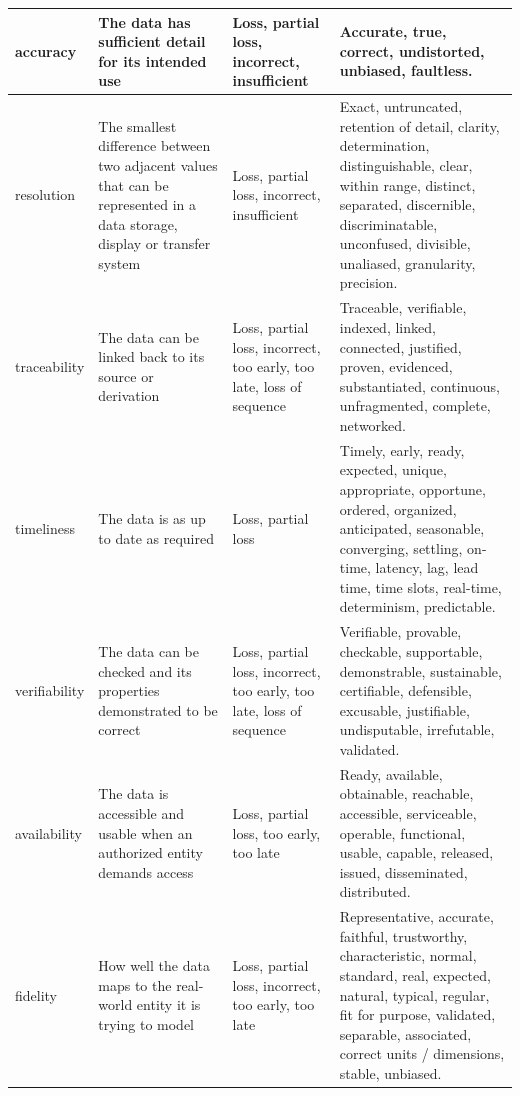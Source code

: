 \begin{longtable}{|L{}|L{}|L{}|L{}|}
  \hline
{}\Gls{accuracy} &
  The data has sufficient detail for its intended use &
  Loss, partial loss, incorrect, insufficient &
  Accurate, true, correct, undistorted, unbiased, faultless.\\
  \hline
{}\Gls{resolution} &
  The smallest difference between two adjacent values that can be represented in a data storage, display or transfer system &
  Loss, partial loss, incorrect, insufficient &
  Exact, untruncated, retention of detail, clarity, determination, distinguishable, clear, within range, distinct, separated, discernible, discriminatable, unconfused, divisible, unaliased, granularity, precision.\\
  \hline
  \Gls{traceability} & The data can be linked back to its source or derivation & Loss, partial loss, incorrect, too early, too late, loss of sequence & Traceable, verifiable, indexed, linked, connected, justified, proven, evidenced, substantiated, continuous, unfragmented, complete, networked.\\
  \hline
  \Gls{timeliness} & The data is as up to date as required & Loss, partial loss & Timely, early, ready, expected, unique, appropriate, opportune, ordered, organized, anticipated, seasonable, converging, settling, on-time, latency, lag, lead time, time slots, real-time, determinism, predictable.\\
  \hline
  \Gls{verifiability} & The data can be checked and its properties demonstrated to be correct & Loss, partial loss, incorrect, too early, too late, loss of sequence & Verifiable, provable, checkable, supportable, demonstrable, sustainable, certifiable, defensible, excusable, justifiable, undisputable, irrefutable, validated.\\
  \hline
{}\Gls{availability} & The data is accessible and usable when an authorized entity demands access & Loss,
  partial loss, too early, too late & Ready, available, obtainable, reachable, accessible, serviceable, operable, functional, usable, capable, released, issued, disseminated, distributed.\\
  \hline
{}\Gls{fidelity} & How well the data maps to the real-world entity it is trying to model & Loss, partial loss, incorrect, too early, too late & Representative, accurate, faithful, trustworthy, characteristic, normal, standard, real, expected, natural, typical, regular, fit for purpose, validated, separable, associated, correct units / dimensions, stable, unbiased.\\

\end{longtable}
